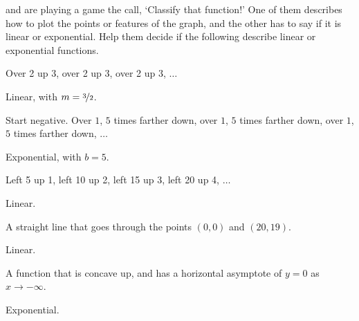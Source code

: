 \begin{exercises}
\begin{problem}
 and  are playing a game the call, `Classify that function!' One of them 
describes how to plot the points or features of the graph, and the other has to say if it is linear 
or exponential. Help them decide if the following describe 
linear or exponential functions.
\begin{subproblem}
	Over 2 up 3, over 2 up 3, over 2 up 3, $\ldots$
	\begin{shortsolution}
		Linear, with $m=\nicefrac{3}{2}$.
	\end{shortsolution}
\end{subproblem}
\begin{subproblem}
	Start negative.  Over $1$, $5$ times farther down, over $1$, $5$ times farther down, over $1$, $5$ times farther down, $\ldots$
	\begin{shortsolution}
		Exponential, with $b=5$.
	\end{shortsolution}
\end{subproblem}
\begin{subproblem}
	Left 5 up 1, left 10 up 2, left 15 up 3, left 20 up 4, $\ldots$
	\begin{shortsolution}
		Linear.
	\end{shortsolution}
\end{subproblem}
\begin{subproblem}
	A straight line that goes through the points $(0,0)$ and $(20,19)$.
	\begin{shortsolution}
		Linear.
	\end{shortsolution}
\end{subproblem}
\begin{subproblem}
	A function that is concave up, and has a horizontal asymptote of $y=0$ as $x\to -\infty$.
	\begin{shortsolution}
		Exponential.
	\end{shortsolution}
\end{subproblem}
\end{problem}
			

\end{exercises}
